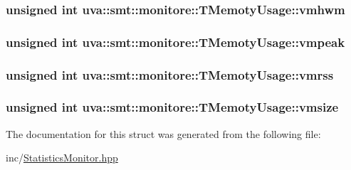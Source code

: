 \subsubsection[{vmhwm}]{\setlength{\rightskip}{0pt plus 5cm}unsigned int uva\+::smt\+::monitore\+::\+T\+Memoty\+Usage\+::vmhwm}\label{structuva_1_1smt_1_1monitore_1_1_t_memoty_usage_a4a7ea0bbc7e0a06c85bd7ed53d3c022a}
\hypertarget{structuva_1_1smt_1_1monitore_1_1_t_memoty_usage_ad95a47875e4fb92f9fac3d0960386e77}{}
\subsubsection[{vmpeak}]{\setlength{\rightskip}{0pt plus 5cm}unsigned int uva\+::smt\+::monitore\+::\+T\+Memoty\+Usage\+::vmpeak}\label{structuva_1_1smt_1_1monitore_1_1_t_memoty_usage_ad95a47875e4fb92f9fac3d0960386e77}
\hypertarget{structuva_1_1smt_1_1monitore_1_1_t_memoty_usage_a55337bfac835a2cdf05d98db116615da}{}
\subsubsection[{vmrss}]{\setlength{\rightskip}{0pt plus 5cm}unsigned int uva\+::smt\+::monitore\+::\+T\+Memoty\+Usage\+::vmrss}\label{structuva_1_1smt_1_1monitore_1_1_t_memoty_usage_a55337bfac835a2cdf05d98db116615da}
\hypertarget{structuva_1_1smt_1_1monitore_1_1_t_memoty_usage_a2899bd97567443117eb064ee4ced277e}{}
\subsubsection[{vmsize}]{\setlength{\rightskip}{0pt plus 5cm}unsigned int uva\+::smt\+::monitore\+::\+T\+Memoty\+Usage\+::vmsize}\label{structuva_1_1smt_1_1monitore_1_1_t_memoty_usage_a2899bd97567443117eb064ee4ced277e}


The documentation for this struct was generated from the following file\+:\begin{DoxyCompactItemize}
\item 
inc/\hyperlink{_statistics_monitor_8hpp}{Statistics\+Monitor.\+hpp}\end{DoxyCompactItemize}
